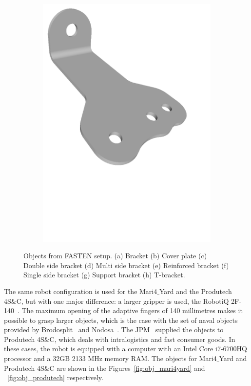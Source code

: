 \begin{figure}[h!]
{\begin{tcolorbox}
\begin{subfigure}[c]{.23\textwidth}
         \includegraphics[trim={0cm 8cm 0cm 0cm},clip,width=1\linewidth,angle=0]{Cap5/Figuras/objects/t_bracket.pdf}
         \caption{}
         \label{fig:t_bracket}
      \end{subfigure}
     \end{tcolorbox}
     \caption{Objects from FASTEN setup. (a) Bracket (b) Cover plate (c) Double side bracket (d) Multi side bracket (e) Reinforced bracket (f) Single side bracket (g) Support bracket (h) T-bracket.}
     \label{fig:obj_fasten}
   }%
 \end{figure}

The same robot configuration is used for the Mari4$\_$Yard and the Produtech 4S\&C, but with one major difference: a larger gripper is used, the RobotiQ 2F-140~\cite{robotiq_grippers}. The maximum opening of the adaptive fingers of 140 millimetres makes it possible to grasp larger objects, which is the case with the set of naval objects provided by Brodosplit~\cite{brodosplit} and Nodosa~\cite{nodosa}. The JPM~\cite{jpm} supplied the objects to Produtech 4S\&C, which deals with intralogistics and fast consumer goods. In these cases, the robot is equipped with a computer with an Intel Core i7-6700HQ processor and a 32GB 2133 MHz memory RAM. The objects for Mari4$\_$Yard and Produtech 4S\&C are shown in the Figures~\ref{fig:obj_mari4yard} and ~\ref{fig:obj_produtech} respectively.

